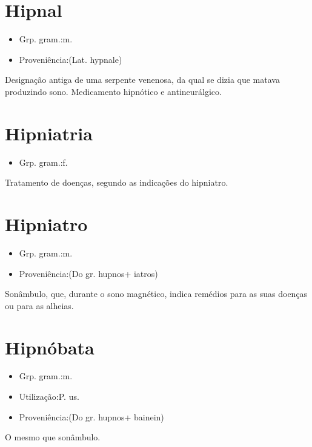 \documentclass{article}
\begin{document}
\section{Hipnal}
\begin{itemize}
\item {Grp. gram.:m.}
\end{itemize}
\begin{itemize}
\item {Proveniência:(Lat. \textunderscore hypnale\textunderscore )}
\end{itemize}
Designação antiga de uma serpente venenosa, da qual se dizia que matava produzindo sono.
Medicamento hipnótico e antineurálgico.
\section{Hipniatria}
\begin{itemize}
\item {Grp. gram.:f.}
\end{itemize}
Tratamento de doenças, segundo as indicações do hipniatro.
\section{Hipniatro}
\begin{itemize}
\item {Grp. gram.:m.}
\end{itemize}
\begin{itemize}
\item {Proveniência:(Do gr. \textunderscore hupnos\textunderscore  + \textunderscore iatros\textunderscore )}
\end{itemize}
Sonâmbulo, que, durante o sono magnético, indica remédios para as suas doenças ou para as alheias.
\section{Hipnóbata}
\begin{itemize}
\item {Grp. gram.:m.}
\end{itemize}
\begin{itemize}
\item {Utilização:P. us.}
\end{itemize}
\begin{itemize}
\item {Proveniência:(Do gr. \textunderscore hupnos\textunderscore  + \textunderscore bainein\textunderscore )}
\end{itemize}
O mesmo que \textunderscore sonâmbulo\textunderscore .
\end{document}
